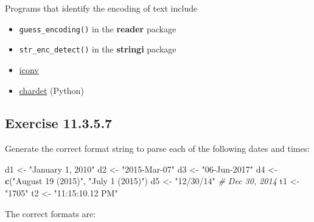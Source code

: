 \documentclass[]{book}
\newenvironment{Shaded}{\begin{snugshade}}{\end{snugshade}}
\newcommand{\CommentTok}[1]{\textcolor[rgb]{0.56,0.35,0.01}{\textit{#1}}}
\newcommand{\KeywordTok}[1]{\textcolor[rgb]{0.13,0.29,0.53}{\textbf{#1}}}
\newcommand{\NormalTok}[1]{#1}
\newcommand{\StringTok}[1]{\textcolor[rgb]{0.31,0.60,0.02}{#1}}
\providecommand{\tightlist}{%
  \setlength{\itemsep}{0pt}\setlength{\parskip}{0pt}}
\theoremstyle{plain}
\theoremstyle{remark}
\begin{document}
Programs that identify the encoding of text include

\begin{itemize}
\tightlist
\item
  \texttt{guess\_encoding()} in the \textbf{reader} package
\item
  \texttt{str\_enc\_detect()} in the \textbf{stringi} package
\item
  \href{https://en.wikipedia.org/wiki/Iconv}{iconv}
\item
  \href{https://github.com/chardet/chardet}{chardet} (Python)
\end{itemize}

\hypertarget{exercise-11.3.5.7}{%
\subsection*{\texorpdfstring{Exercise {11.3.5.7}}{Exercise 11.3.5.7}}\label{exercise-11.3.5.7}}

Generate the correct format string to parse each of the following dates and times:

\begin{Shaded}
\begin{Highlighting}[]
\NormalTok{d1 <-}\StringTok{ "January 1, 2010"}
\NormalTok{d2 <-}\StringTok{ "2015-Mar-07"}
\NormalTok{d3 <-}\StringTok{ "06-Jun-2017"}
\NormalTok{d4 <-}\StringTok{ }\KeywordTok{c}\NormalTok{(}\StringTok{"August 19 (2015)"}\NormalTok{, }\StringTok{"July 1 (2015)"}\NormalTok{)}
\NormalTok{d5 <-}\StringTok{ "12/30/14"} \CommentTok{# Dec 30, 2014}
\NormalTok{t1 <-}\StringTok{ "1705"}
\NormalTok{t2 <-}\StringTok{ "11:15:10.12 PM"}
\end{Highlighting}
\end{Shaded}

The correct formats are:

\begin{Shaded}
\end{Shaded}
\end{document}
